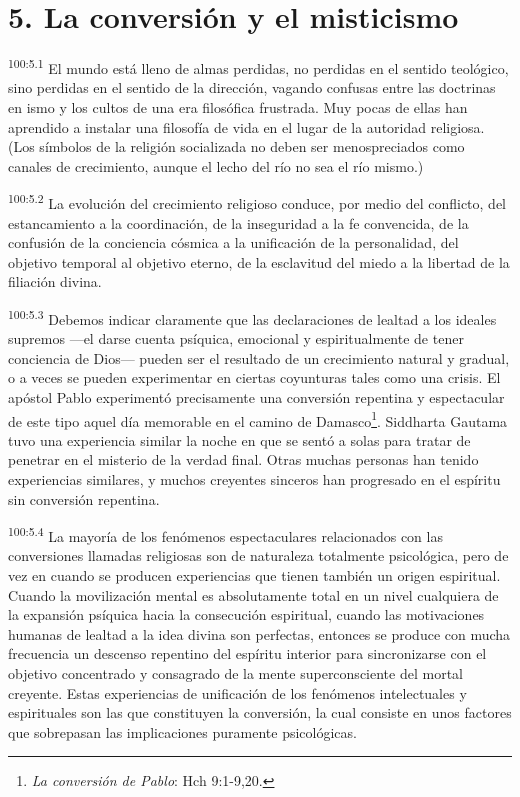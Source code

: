 \documentclass[twoside, 11pt]{book}
\begin{document}
\section*{5. La conversión y el misticismo}
\par
\textsuperscript{100:5.1} El mundo está lleno de almas perdidas, no perdidas en el sentido teológico, sino perdidas en el sentido de la dirección, vagando confusas entre las doctrinas en ismo y los cultos de una era filosófica frustrada. Muy pocas de ellas han aprendido a instalar una filosofía de vida en el lugar de la autoridad religiosa. (Los símbolos de la religión socializada no deben ser menospreciados como canales de crecimiento, aunque el lecho del río no sea el río mismo.)

\par
\textsuperscript{100:5.2} La evolución del crecimiento religioso conduce, por medio del conflicto, del estancamiento a la coordinación, de la inseguridad a la fe convencida, de la confusión de la conciencia cósmica a la unificación de la personalidad, del objetivo temporal al objetivo eterno, de la esclavitud del miedo a la libertad de la filiación divina.

\par
\textsuperscript{100:5.3} Debemos indicar claramente que las declaraciones de lealtad a los ideales supremos ---el darse cuenta psíquica, emocional y espiritualmente de tener conciencia de Dios--- pueden ser el resultado de un crecimiento natural y gradual, o a veces se pueden experimentar en ciertas coyunturas tales como una crisis. El apóstol Pablo experimentó precisamente una conversión repentina y espectacular de este tipo aquel día memorable en el camino de Damasco\footnote{\textit{La conversión de Pablo}: Hch 9:1-9,20.}. Siddharta Gautama tuvo una experiencia similar la noche en que se sentó a solas para tratar de penetrar en el misterio de la verdad final. Otras muchas personas han tenido experiencias similares, y muchos creyentes sinceros han progresado en el espíritu sin conversión repentina.

\par
\textsuperscript{100:5.4} La mayoría de los fenómenos espectaculares relacionados con las conversiones llamadas religiosas son de naturaleza totalmente psicológica, pero de vez en cuando se producen experiencias que tienen también un origen espiritual. Cuando la movilización mental es absolutamente total en un nivel cualquiera de la expansión psíquica hacia la consecución espiritual, cuando las motivaciones humanas de lealtad a la idea divina son perfectas, entonces se produce con mucha frecuencia un descenso repentino del espíritu interior para sincronizarse con el objetivo concentrado y consagrado de la mente superconsciente del mortal creyente. Estas experiencias de unificación de los fenómenos intelectuales y espirituales son las que constituyen la conversión, la cual consiste en unos factores que sobrepasan las implicaciones puramente psicológicas.
\end{document}
